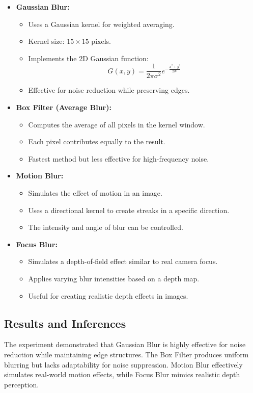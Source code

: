 \documentclass[12pt,a4paper]{article}
\begin{document}
\begin{itemize}
  \item \textbf{Gaussian Blur:}
    \begin{itemize}
      \item Uses a Gaussian kernel for weighted averaging.
      \item Kernel size: \(15 \times 15\) pixels.
      \item Implements the 2D Gaussian function:
        \[
          G(x,y) = \frac{1}{2\pi\sigma^2}e^{-\frac{x^2+y^2}{2\sigma^2}}
        \]
      \item Effective for noise reduction while preserving edges.
    \end{itemize}

  \item \textbf{Box Filter (Average Blur):}
    \begin{itemize}
      \item Computes the average of all pixels in the kernel window.
      \item Each pixel contributes equally to the result.
      \item Fastest method but less effective for high-frequency noise.
    \end{itemize}

  \item \textbf{Motion Blur:}
    \begin{itemize}
      \item Simulates the effect of motion in an image.
      \item Uses a directional kernel to create streaks in a specific direction.
      \item The intensity and angle of blur can be controlled.
    \end{itemize}

  \item \textbf{Focus Blur:}
    \begin{itemize}
      \item Simulates a depth-of-field effect similar to real camera focus.
      \item Applies varying blur intensities based on a depth map.
      \item Useful for creating realistic depth effects in images.
    \end{itemize}
\end{itemize}

\subsection{Results and Inferences}
The experiment demonstrated that Gaussian Blur is highly effective for noise reduction while maintaining edge structures. The Box Filter produces uniform blurring but lacks adaptability for noise suppression. Motion Blur effectively simulates real-world motion effects, while Focus Blur mimics realistic depth perception.
\end{document}
